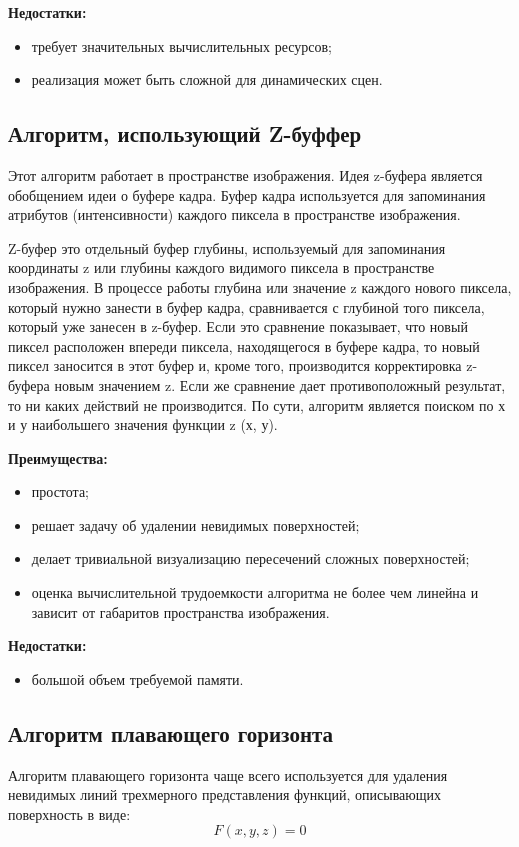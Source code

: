 \textbf{Недостатки:}
\begin{itemize}
	\item требует значительных вычислительных ресурсов;
	\item реализация может быть сложной для динамических сцен.
\end{itemize} 
\subsection{Алгоритм, использующий Z-буффер}
Этот алгоритм работает в пространстве изображения. Идея z-буфера является обобщением идеи о буфере кадра. Буфер кадра используется для запоминания атрибутов (интенсивности) каждого пиксела в пространстве изображения. 

Z-буфер это отдельный буфер глубины, используемый для запоминания координаты z или глубины каждого видимого пиксела в пространстве изображения. В процессе работы глубина или значение z каждого нового пиксела, который нужно занести в буфер кадра, сравнивается с глубиной того пиксела, который уже занесен в z-буфер. Если это сравнение показывает, что новый пиксел расположен впереди пиксела, находящегося в буфере кадра, то новый пиксел заносится в этот буфер и, кроме того, производится корректировка z-буфера новым значением z. Если же сравнение дает противоположный результат, то ни каких действий не производится. По сути, алгоритм является поиском по х и у наибольшего значения функции z (х, у).

\textbf{Преимущества:}
\begin{itemize}
	\item простота\cite{rogers};
	\item решает задачу об удалении невидимых поверхностей;
	\item делает тривиальной визуализацию пересечений сложных поверхностей;
	\item оценка вычислительной трудоемкости алгоритма не более чем линейна и зависит от габаритов пространства изображения.
\end{itemize}

\textbf{Недостатки:}
\begin{itemize}
	\item большой объем требуемой памяти.
\end{itemize}
\subsection{Алгоритм плавающего горизонта}
Алгоритм плавающего горизонта чаще всего используется для удаления невидимых линий трехмерного представления функций, описывающих поверхность в виде:
\[
F(x, y, z) = 0
\]

